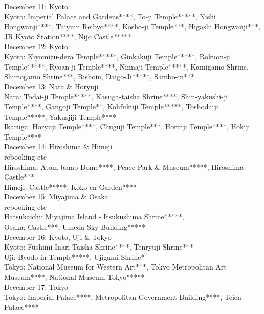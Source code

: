 December 11: Kyoto\\
Kyoto: Imperial Palace and Gardens****, To-ji Temple*****, Nishi Hongwanji****, Taiyuin Reibyo****, Kosho-ji Temple***, Higashi Hongwanji***, JR Kyoto Station****, Nijo Castle*****\\

December 12: Kyoto\\
Kyoto: Kiyomizu-dera  Temple*****, Ginkakuji  Temple*****, Rokuon-ji  Temple*****, Ryoan-ji Temple****, Ninnaji Temple*****, Kamigamo-Shrine, Shimogamo Shrine***, Rishoin, Daigo-Ji*****, Sambo-in***\\

December 13: Nara \& Horyuji\\
Nara: Todai-ji Temple*****, Kasuga-taisha Shrine****, Shin-yakushi-ji Temple****, Gangoji Temple**, Kohfukuji Temple*****, Toshodaiji Temple*****, Yakusjiji Temple****\\
Ikaruga: Horyuji Temple****, Chuguji Temple***, Horinji Temple****, Hokiji Temple****\\

December 14: Hiroshima \& Himeji\\
rebooking etc\\

Hiroshima: Atom bomb Dome****, Peace Park \& Museum*****, Hiroshima Castle***\\
Himeji: Castle*****, Koko-en Garden****\\

December 15: Miyajima \& Osaka\\
rebooking etc\\

Hatsukaichi: Miyajima Island - Itsukushima Shrine*****,\\
Osaka: Castle***, Umeda Sky Building*****\\

December 16: Kyoto, Uji \& Tokyo\\
Kyoto: Fushimi Inari-Taisha Shrine****, Tenryuji Shrine***\\
Uji: Byodo-in Temple*****, Ujigami Shrine*\\
Tokyo: National Museum for Western Art***, Tokyo Metropolitan Art Museum****, National Museum Tokyo*****\\

December 17: Tokyo\\
Tokyo: Imperial Palace****, Metropolitan Government Building****, Teien Palace****